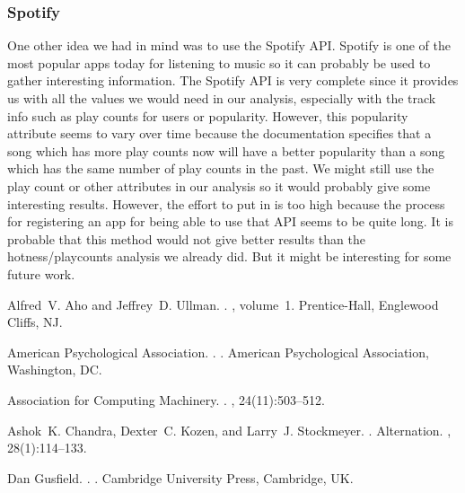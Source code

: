 \documentclass[11pt]{article}
\begin{document}
\subsubsection{Spotify}
One other idea we had in mind was to use the Spotify API. Spotify is one of the most
popular apps today for listening to music so it can probably be used to gather interesting information. The
Spotify API is very complete since it provides us with all the values we would need in our analysis,
especially with the track info such as play counts for users or popularity. However, this popularity
attribute seems to vary over time because the documentation specifies that a song which has more play
counts now will have a better popularity than a song which has the same number of play counts in the
past. We might still use the play count or other attributes in our analysis so it would probably give some
interesting results. However, the effort to put in is too high because the process for registering an app for
being able to use that API seems to be quite long. It is probable that this method would not give better
results than the hotness/playcounts analysis we already did. But it might be interesting for some future
work.

\begin{thebibliography}{}

Alfred~V. Aho and Jeffrey~D. Ullman.
.
, volume~1.
\newblock Prentice-{Hall}, Englewood Cliffs, NJ.

{American Psychological Association}.
.
.
\newblock American Psychological Association, Washington, DC.

{Association for Computing Machinery}.
.
, 24(11):503--512.

Ashok~K. Chandra, Dexter~C. Kozen, and Larry~J. Stockmeyer.
.
\newblock Alternation.
,
  28(1):114--133.

Dan Gusfield.
.
.
\newblock Cambridge University Press, Cambridge, UK.

\end{thebibliography}
\end{document}
